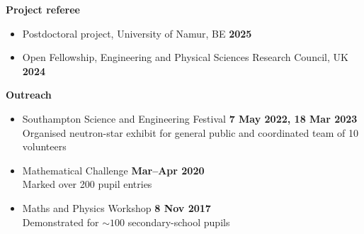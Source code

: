 \documentclass[%
    margin,
    line,
    11pt,
]{res}
\begin{document}
\begin{resume}
\textbf{Project referee}
\vspace*{0.05in}
\begin{itemize}
    \item[] Postdoctoral project, University of Namur, BE \hfill \textbf{2025}
    \item[] Open Fellowship,
    Engineering and Physical Sciences Research Council, UK \hfill \textbf{2024}
\end{itemize}

\textbf{Outreach}
\vspace*{0.05in}
\begin{itemize}
    \item[] Southampton Science and Engineering Festival
    \hfill \textbf{7 May 2022, 18 Mar 2023} \\
    \hspace*{1em} Organised neutron-star exhibit for general public and
    coordinated team of 10 volunteers
    \item[] Mathematical Challenge \hfill \textbf{Mar--Apr 2020} \\
    \hspace*{1em} Marked over 200 pupil entries
    \item[] Maths and Physics Workshop \hfill \textbf{8 Nov 2017} \\
    \hspace*{1em} Demonstrated for $\sim 100$ secondary-school pupils
\end{itemize}


\end{resume}
\end{document}
